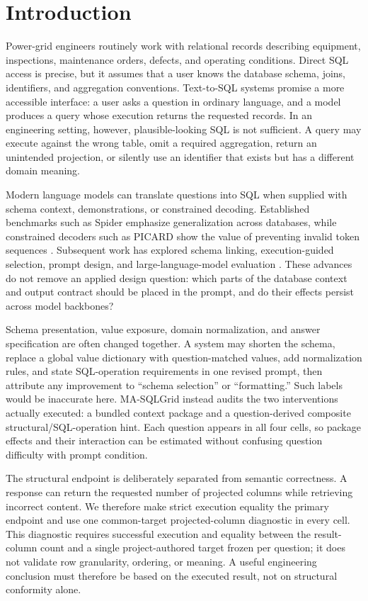 \documentclass[applsci,article,submit,moreauthors]{Definitions/mdpi}
\newcommand{\masql}{MA-SQLGrid}
\begin{document}
\section{Introduction}
Power-grid engineers routinely work with relational records describing equipment, inspections, maintenance orders, defects, and operating conditions. Direct SQL access is precise, but it assumes that a user knows the database schema, joins, identifiers, and aggregation conventions. Text-to-SQL systems promise a more accessible interface: a user asks a question in ordinary language, and a model produces a query whose execution returns the requested records. In an engineering setting, however, plausible-looking SQL is not sufficient. A query may execute against the wrong table, omit a required aggregation, return an unintended projection, or silently use an identifier that exists but has a different domain meaning.

Modern language models can translate questions into SQL when supplied with schema context, demonstrations, or constrained decoding. Established benchmarks such as Spider emphasize generalization across databases, while constrained decoders such as PICARD show the value of preventing invalid token sequences \cite{yu2018spider,scholak2021picard}. Subsequent work has explored schema linking, execution-guided selection, prompt design, and large-language-model evaluation \cite{katsogiannis2023survey,nan2023enhancing,sun2023sqlprompt}. These advances do not remove an applied design question: which parts of the database context and output contract should be placed in the prompt, and do their effects persist across model backbones?

Schema presentation, value exposure, domain normalization, and answer specification are often changed together. A system may shorten the schema, replace a global value dictionary with question-matched values, add normalization rules, and state SQL-operation requirements in one revised prompt, then attribute any improvement to ``schema selection'' or ``formatting.'' Such labels would be inaccurate here. \masql{} instead audits the two interventions actually executed: a bundled context package and a question-derived composite structural/SQL-operation hint. Each question appears in all four cells, so package effects and their interaction can be estimated without confusing question difficulty with prompt condition.

The structural endpoint is deliberately separated from semantic correctness. A response can return the requested number of projected columns while retrieving incorrect content. We therefore make strict execution equality the primary endpoint and use one common-target projected-column diagnostic in every cell. This diagnostic requires successful execution and equality between the result-column count and a single project-authored target frozen per question; it does not validate row granularity, ordering, or meaning. A useful engineering conclusion must therefore be based on the executed result, not on structural conformity alone.
\end{document}
